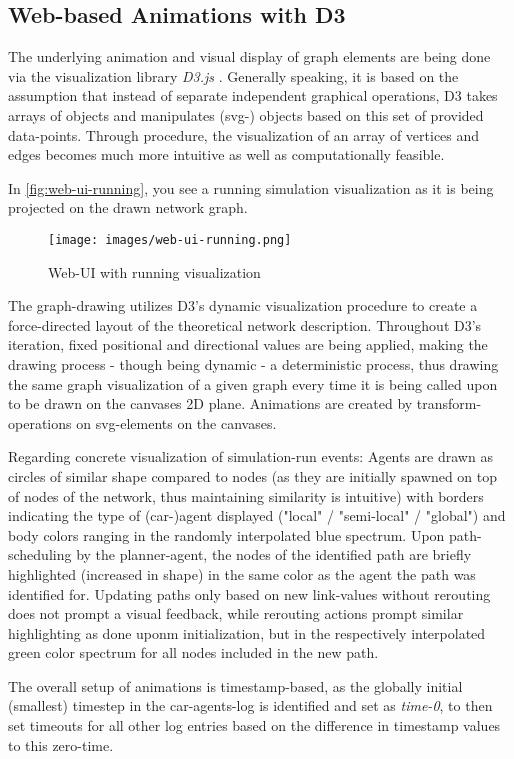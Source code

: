 \subsection{Web-based Animations with D3}\label{subsec:d3}

The underlying animation and visual display of graph elements are being done via the visualization library \textit{D3.js} \cite{bostock2012d3}.
Generally speaking, it is based on the assumption that instead of separate independent graphical operations, D3 takes arrays of objects and manipulates (svg-) objects based on this set of provided data-points. Through procedure, the visualization of an array of vertices and edges becomes much more intuitive as well as computationally feasible.

In \autoref{fig:web-ui-running}, you see a running simulation visualization as it is being projected on the drawn network graph.

\begin{figure}
    \centering
    \texttt{[image: images/web-ui-running.png]}
    \caption{Web-UI with running visualization}
    \label{fig:web-ui-running}
\end{figure}

The graph-drawing utilizes D3's dynamic visualization procedure to create a force-directed layout of the theoretical network description. Throughout D3's iteration, fixed positional and directional values are being applied, making the drawing process - though being dynamic - a deterministic process, thus drawing the same graph visualization of a given graph every time it is being called upon to be drawn on the canvases 2D plane.
Animations are created by transform-operations on svg-elements on the canvases.

Regarding concrete visualization of simulation-run events:
Agents are drawn as circles of similar shape compared to nodes (as they are initially spawned on top of nodes of the network, thus maintaining similarity is intuitive) with borders indicating the type of (car-)agent displayed ("local" / "semi-local" / "global") and body colors ranging in the randomly interpolated blue spectrum.
Upon path-scheduling by the planner-agent, the nodes of the identified path are briefly highlighted (increased in shape) in the same color as the agent the path was identified for. Updating paths only based on new link-values without rerouting does not prompt a visual feedback, while rerouting actions prompt similar highlighting as done uponm initialization, but in the respectively interpolated green color spectrum for all nodes included in the new path.

The overall setup of animations is timestamp-based, as the globally initial (smallest) timestep in the car-agents-log is identified and set as \textit{time-0}, to then set timeouts for all other log entries based on the difference in timestamp values to this zero-time.
